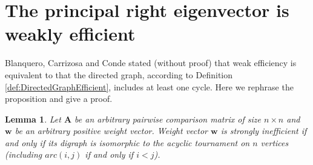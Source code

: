 \documentclass{article}
\theoremstyle{plain}
\newtheorem{lemma}{Lemma}[section]
\begin{document}
\newpage
\section{The principal right eigenvector is weakly ef{\kern0pt}f{\kern0pt}icient}
\label{section:3} %

Blanquero, Carrizosa and Conde \cite[p.~279]{BlanqueroCarrizosaConde2006} stated (without proof) that
weak ef{\kern0pt}f{\kern0pt}iciency is equivalent to that the directed graph, according to Def{\kern0pt}inition \ref{def:DirectedGraphEfficient}, includes at least one cycle. Here we rephrase
the proposition and give a proof.

\begin{lemma} \label{lemma:acyclic}
Let $\mathbf{A}$ be an arbitrary pairwise comparison matrix of size $n \times n$
and $\mathbf{w}$ be an arbitrary positive weight vector.
Weight vector $\mathbf{w}$ is strongly inef{\kern0pt}f{\kern0pt}icient if and only if
its digraph is isomorphic to the acyclic tournament on $n$ vertices (including
$arc(i,j)$ if and only if $i < j$).
\end{lemma}
\end{document}
